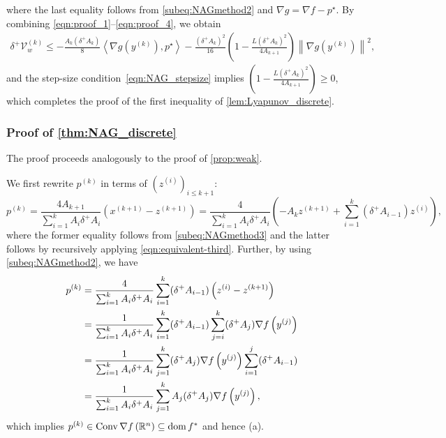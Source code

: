 \documentclass[11pt,a4paper]{article}
\theoremstyle{definition}
\theoremstyle{plain}
\newcommand{\RR}{{\mathbb{R}}}
\newcommand{\dom}{\mathop{\rm dom}}
\newcommand{\conv}{\mathop{\rm Conv}}
\begin{document}
where the last equality follows from \eqref{subeq:NAGmethod2} and $\nabla g = \nabla f - p^\star$.
By combining \eqref{eqn:proof_1}--\eqref{eqn:proof_4}, we obtain
\begin{align*}
    \delta^+\mathcal{V}_w^{(k)} \le -\frac{A_k(\delta^+A_k)}8\left\langle\nabla g\left(y^{(k)}\right), p^\star\right\rangle - \frac{(\delta^+A_k)^2}{16}\left(1 - \frac{L(\delta^+A_k)^2}{4A_{k + 1}}\right)\left\|\nabla g\left(y^{(k)}\right)\right\|^2,
\end{align*}
and the step-size condition~\eqref{eqn:NAG_stepsize} implies $\left(1 - \frac{L(\delta^+A_k)^2}{4A_{k + 1}}\right) \ge 0$, which completes the proof of the first inequality of \cref{lem:Lyapunov_discrete}.

\subsubsection{Proof of \texorpdfstring{\cref{thm:NAG_discrete}}{Theorem \ref{thm:NAG_discrete}}}\label{subsec:proof-p}
    The proof proceeds analogously to the proof of \cref{prop:weak}.

    We first rewrite $p^{(k)}$ in terms of $(z^{(i)})_{i \le k + 1}$:
    \begin{equation}
        p^{(k)}
        = \frac{4A_{k + 1}}{\sum_{i = 1}^kA_i\delta^+A_i}\left(x^{(k + 1)} - z^{(k + 1)}\right)
        = \frac4{\sum_{i = 1}^kA_i\delta^+A_i}\left(-A_kz^{(k + 1)} +\sum_{i = 1}^k(\delta^+A_{i - 1})z^{(i)}\right),\label{eqn:Lyapunov_discrete_proof_1}
    \end{equation}
    where the former equality follows from \eqref{subeq:NAGmethod3} and the latter follows by recursively applying \eqref{eqn:equivalent-third}.
    Further, by using \eqref{subeq:NAGmethod2}, we have
    \begin{align}
        p^{(k)}
        &= \frac4{\sum_{i = 1}^kA_i\delta^+A_i}\sum_{i = 1}^k(\delta^+A_{i - 1})\left(z^{(i)} - z^{(k + 1)}\right)\notag\\
        &= \frac1{\sum_{i = 1}^kA_i\delta^+A_i}\sum_{i = 1}^k(\delta^+A_{i - 1})\sum_{j = i}^k(\delta^+A_j)\nabla f\left(y^{(j)}\right)\notag\\
        &= \frac1{\sum_{i = 1}^kA_i\delta^+A_i}\sum_{j = 1}^k(\delta^+A_j)\nabla f\left(y^{(j)}\right)\sum_{i = 1}^j(\delta^+A_{i - 1})\notag\\
        &= \frac1{\sum_{i = 1}^kA_i\delta^+A_i}\sum_{j = 1}^kA_j(\delta^+A_j)\nabla f\left(y^{(j)}\right),\label{eqn:Lyapunov_discrete_proof_2}
    \end{align}
    which implies $p^{(k)} \in \conv \nabla f\left(\RR^n\right) \subseteq \dom f^\ast$ and hence (a).
\end{document}
